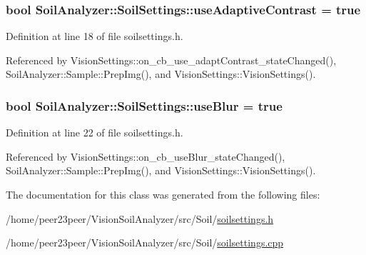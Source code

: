 \hypertarget{class_soil_analyzer_1_1_soil_settings_a0e27335d05aed8f3f084744062368578}{}
\subsubsection[{use\+Adaptive\+Contrast}]{\setlength{\rightskip}{0pt plus 5cm}bool Soil\+Analyzer\+::\+Soil\+Settings\+::use\+Adaptive\+Contrast = true}\label{class_soil_analyzer_1_1_soil_settings_a0e27335d05aed8f3f084744062368578}


Definition at line 18 of file soilsettings.\+h.



Referenced by Vision\+Settings\+::on\+\_\+cb\+\_\+use\+\_\+adapt\+Contrast\+\_\+state\+Changed(), Soil\+Analyzer\+::\+Sample\+::\+Prep\+Img(), and Vision\+Settings\+::\+Vision\+Settings().

\hypertarget{class_soil_analyzer_1_1_soil_settings_a21bd246a48a712734af86f592030e18b}{}
\subsubsection[{use\+Blur}]{\setlength{\rightskip}{0pt plus 5cm}bool Soil\+Analyzer\+::\+Soil\+Settings\+::use\+Blur = true}\label{class_soil_analyzer_1_1_soil_settings_a21bd246a48a712734af86f592030e18b}


Definition at line 22 of file soilsettings.\+h.



Referenced by Vision\+Settings\+::on\+\_\+cb\+\_\+use\+Blur\+\_\+state\+Changed(), Soil\+Analyzer\+::\+Sample\+::\+Prep\+Img(), and Vision\+Settings\+::\+Vision\+Settings().



The documentation for this class was generated from the following files\+:\begin{DoxyCompactItemize}
\item 
/home/peer23peer/\+Vision\+Soil\+Analyzer/src/\+Soil/\hyperlink{soilsettings_8h}{soilsettings.\+h}\item 
/home/peer23peer/\+Vision\+Soil\+Analyzer/src/\+Soil/\hyperlink{soilsettings_8cpp}{soilsettings.\+cpp}\end{DoxyCompactItemize}
